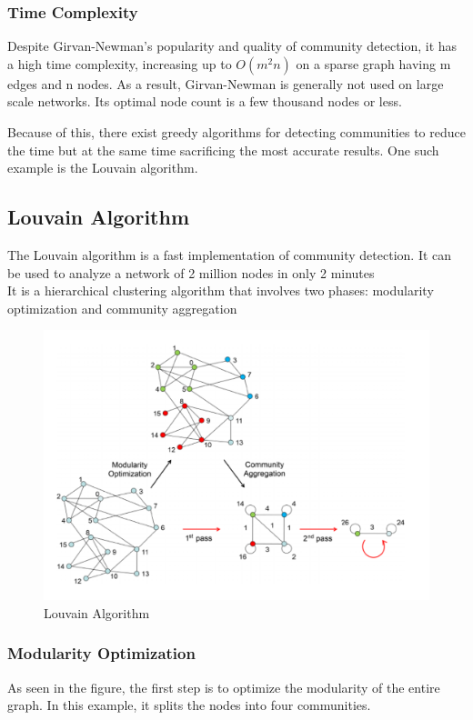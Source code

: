 \subsubsection{Time Complexity}
Despite Girvan-Newman’s popularity and quality of community detection, it has a high time complexity, increasing up to $O(m^2n)$ on a sparse graph having m edges and n nodes. As a result, Girvan-Newman is generally not used on large scale networks. Its optimal node count is a few thousand nodes or less.

Because of this, there exist greedy algorithms for detecting communities to reduce the time but at the same time sacrificing the most accurate results. One such example is the Louvain algorithm.
\subsection{Louvain Algorithm}
The Louvain algorithm is a fast implementation of community detection. It can be used to analyze a network of 2 million nodes in only 2 minutes \\
\newline
It is a hierarchical clustering algorithm that involves two phases: modularity optimization and community aggregation 
\begin{center}
    \begin{figure}[!htp]
    \centering
    \includegraphics[width=0.7 \textwidth]{image/Louvain.png}
    \caption{Louvain Algorithm}
    \label{subsection}
\end{figure}
\end{center}
\subsubsection{Modularity Optimization}
As seen in the figure, the first step is to optimize the modularity of the entire graph. In this example, it splits the nodes into four communities.

